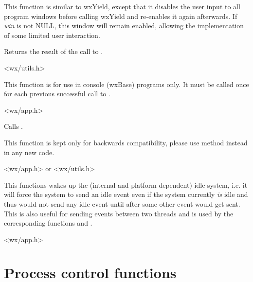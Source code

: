 This function is similar to wxYield, except that it disables the user input to
all program windows before calling wxYield and re-enables it again
afterwards. If {\it win} is not NULL, this window will remain enabled,
allowing the implementation of some limited user interaction.

Returns the result of the call to .


<wx/utils.h>

\label{wxuninitialize}


This function is for use in console (wxBase) programs only. It must be called
once for each previous successful call to .


<wx/app.h>

\label{wxyield}


Calls .

This function is kept only for backwards compatibility, please use 
method instead in any new code.


<wx/app.h> or <wx/utils.h>

\label{wxwakeupidle}


This functions wakes up the (internal and platform dependent) idle system, i.e. it
will force the system to send an idle event even if the system currently {\it is}
 idle and thus would not send any idle event until after some other event would get
sent. This is also useful for sending events between two threads and is used by
the corresponding functions  and
.


<wx/app.h>

\section{Process control functions}\label{processfunctions}

